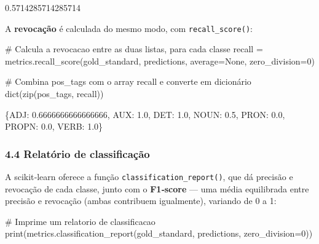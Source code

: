 \documentclass[
  brazilian,
  11pt,
]{article}
\newenvironment{Shaded}{\begin{snugshade}}{\end{snugshade}}
\newcommand{\BuiltInTok}[1]{\textcolor[rgb]{0.50,0.55,0.55}{#1}}
\newcommand{\CommentTok}[1]{\textcolor[rgb]{0.48,0.49,0.49}{#1}}
\newcommand{\DecValTok}[1]{\textcolor[rgb]{0.96,0.45,0.00}{#1}}
\newcommand{\NormalTok}[1]{\textcolor[rgb]{0.81,0.81,0.76}{#1}}
\newcommand{\OperatorTok}[1]{\textcolor[rgb]{0.81,0.81,0.76}{#1}}
\newcommand{\VariableTok}[1]{\textcolor[rgb]{0.15,0.68,0.68}{#1}}
\let\oldtexttt\texttt
\renewcommand{\texttt}[1]{{\color{inlink}\oldtexttt{#1}}}
\begin{document}
\begin{Shaded}
\begin{Highlighting}[]
\NormalTok{0.5714285714285714}
\end{Highlighting}
\end{Shaded}

A \textbf{revocação} é calculada do mesmo modo, com
\texttt{recall\_score()}:

\begin{Shaded}
\begin{Highlighting}[]
\CommentTok{\# Calcula a revocacao entre as duas listas, para cada classe}
\NormalTok{recall }\OperatorTok{=}\NormalTok{ metrics.recall\_score(gold\_standard, predictions, average}\OperatorTok{=}\VariableTok{None}\NormalTok{, zero\_division}\OperatorTok{=}\DecValTok{0}\NormalTok{)}

\CommentTok{\# Combina \textquotesingle{}pos\_tags\textquotesingle{} com o array \textquotesingle{}recall\textquotesingle{} e converte em dicionário}
\BuiltInTok{dict}\NormalTok{(}\BuiltInTok{zip}\NormalTok{(pos\_tags, recall))}
\end{Highlighting}
\end{Shaded}

\begin{Shaded}
\begin{Highlighting}[]
\NormalTok{\{\textquotesingle{}ADJ\textquotesingle{}: 0.6666666666666666, \textquotesingle{}AUX\textquotesingle{}: 1.0, \textquotesingle{}DET\textquotesingle{}: 1.0, \textquotesingle{}NOUN\textquotesingle{}: 0.5, \textquotesingle{}PRON\textquotesingle{}: 0.0, \textquotesingle{}PROPN\textquotesingle{}: 0.0, \textquotesingle{}VERB\textquotesingle{}: 1.0\}}
\end{Highlighting}
\end{Shaded}

\subsubsection{4.4 Relatório de
classificação}\label{relatuxf3rio-de-classificauxe7uxe3o}

A scikit‑learn oferece a função \texttt{classification\_report()}, que
dá precisão e revocação de cada classe, junto com o \textbf{F1‑score}
--- uma média equilibrada entre precisão e revocação (ambas contribuem
igualmente), variando de 0 a 1:

\begin{Shaded}
\begin{Highlighting}[]
\CommentTok{\# Imprime um relatorio de classificacao}
\BuiltInTok{print}\NormalTok{(metrics.classification\_report(gold\_standard, predictions, zero\_division}\OperatorTok{=}\DecValTok{0}\NormalTok{))}
\end{Highlighting}
\end{Shaded}
\end{document}
